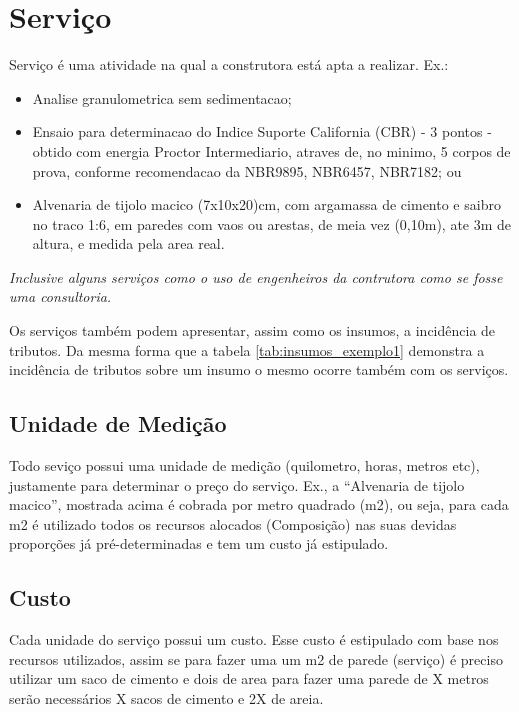\chapter{Serviço}

Serviço é uma atividade na qual a construtora está apta a realizar. Ex.:

\begin{itemize}
	\item Analise granulometrica sem sedimentacao;
	\item Ensaio para determinacao do Indice Suporte California (CBR) - 3 pontos - obtido com energia Proctor Intermediario, atraves de, no minimo, 5 corpos de prova, conforme recomendacao da NBR9895, NBR6457, NBR7182; ou
	\item Alvenaria de tijolo macico (7x10x20)cm, com argamassa de cimento e saibro no traco 1:6, em paredes com vaos ou arestas, de meia vez (0,10m), ate 3m de altura, e medida pela area real.
\end{itemize}

\emph{Inclusive alguns serviços como o uso de engenheiros da contrutora como se fosse uma consultoria.}

Os serviços também podem apresentar, assim como os insumos, a incidência de tributos. Da mesma forma que a tabela \ref{tab:insumos_exemplo1} demonstra a incidência de tributos sobre um insumo o mesmo ocorre também com os serviços.

\section{Unidade de Medição}

Todo seviço possui uma unidade de medição (quilometro, horas, metros etc), justamente para determinar o preço do serviço. Ex., a ``Alvenaria de tijolo macico'', mostrada acima é cobrada por metro quadrado (m2), ou seja, para cada m2 é utilizado todos os recursos alocados (Composição) nas suas devidas proporções já pré-determinadas e tem um custo já estipulado.

\section{Custo}

Cada unidade do serviço possui um custo. Esse custo é estipulado com base nos recursos utilizados, assim se para fazer uma um m2 de parede (serviço) é preciso utilizar um saco de cimento e dois de area para fazer uma parede de X metros serão necessários X sacos de cimento e 2X de areia.